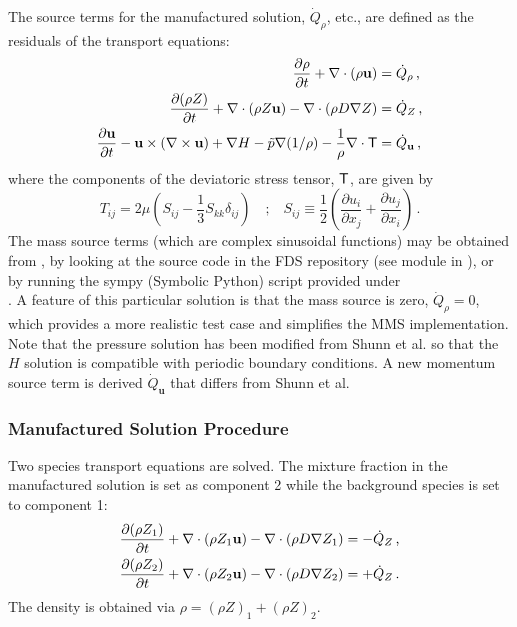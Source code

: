 \documentclass[11pt]{book}
\begin{document}
The source terms for the manufactured solution, $\dot{Q}_\rho$, etc., are defined as the residuals of the transport equations:
\begin{align}
\label{eqn_mms_continuity} \frac{\partial \rho}{\partial t} + \nabla\cdot(\rho \mathbf{u}) &= \dot{Q}_\rho \,\mbox{,}\\
\frac{\partial (\rho Z)}{\partial t} + \nabla\cdot(\rho Z \mathbf{u}) - \nabla\cdot\left(\rho D \nabla Z\right) &= \dot{Q}_Z \,\mbox{,}\\
\frac{\partial \mathbf{u}}{\partial t} - \mathbf{u} \times (\nabla \times \mathbf{u}) + \nabla H - \tilde{p} \nabla(1/\rho) - \frac{1}{\rho}\nabla\cdot{\sf T} &= \dot{Q}_{\mathbf{u}} \,\mbox{,}
\end{align}
where the components of the deviatoric stress tensor, ${\sf T}$, are given by
\begin{equation}
T_{ij} = 2\mu \left( S_{ij} -  \frac{1}{3} S_{kk} \delta_{ij} \right) \quad\mbox{;}\quad S_{ij} \equiv \frac{1}{2}\left( \frac{\partial u_i}{\partial x_j} + \frac{\partial u_j}{\partial x_i} \right) \,\mbox{.}
\end{equation}
The mass source terms (which are complex sinusoidal functions) may be obtained from \cite{Shunn:2012}, by looking at the source code in the FDS repository \cite{FDS-SMV_repository} (see module  in ), or by running the sympy (Symbolic Python) script provided under\\
.  A feature of this particular solution is that the mass source is zero, $\dot{Q}_\rho = 0$, which provides a more realistic test case and simplifies the MMS implementation.  Note that the pressure solution has been modified from Shunn et al. \cite{Shunn:2012} so that the $H$ solution is compatible with periodic boundary conditions.  A new momentum source term is derived $\dot{Q}_{\mathbf{u}}$ that differs from Shunn et al.

\subsubsection*{Manufactured Solution Procedure}

Two species transport equations are solved.  The mixture fraction in the manufactured solution is set as component 2 while the background species is set to component 1:
\begin{align}
\label{eqn_fds_species_1} \frac{\partial (\rho Z_1)}{\partial t} + \nabla\cdot(\rho Z_1 \mathbf{u}) - \nabla\cdot\left(\rho D \nabla Z_1\right) &= - \dot{Q}_Z \,\mbox{,}\\
\label{eqn_fds_species_2} \frac{\partial (\rho Z_2)}{\partial t} + \nabla\cdot(\rho Z_2 \mathbf{u}) - \nabla\cdot\left(\rho D \nabla Z_2\right) &= + \dot{Q}_Z \,\mbox{.}
\end{align}
The density is obtained via $\rho = (\rho Z)_1 + (\rho Z)_2$.
\end{document}
